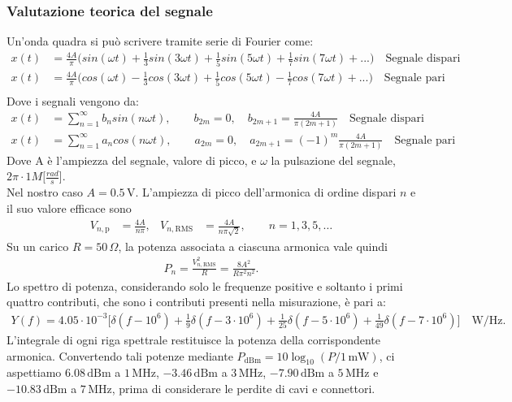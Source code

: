 \documentclass[11pt,a4paper,oneside]{book}
\begin{document}
\subsubsection{Valutazione teorica del segnale}
Un'onda quadra si può scrivere tramite serie di Fourier come:
\begin{align}
x(t)&= \frac{4A}{\pi}\bigg(sin(\omega t)+\frac{1}{3}sin(3\omega t)+\frac{1}{5}sin(5\omega t)+\frac{1}{7}sin(7\omega t)+... \bigg) \quad \text{Segnale dispari} \\
x(t)&= \frac{4A}{\pi}\bigg(cos(\omega t)-\frac{1}{3}cos(3\omega t)+\frac{1}{5}cos(5\omega t)-\frac{1}{7}cos(7\omega t)+... \bigg) \quad \text{Segnale pari} \\
\end{align} 
Dove i segnali vengono da:
\begin{align}
x(t)&=\sum_{n=1}^\infty b_n sin(n\omega t), \qquad b_{2m}=0,\quad b_{2m+1}=\frac{4A}{\pi(2m+1)} \quad \text{Segnale dispari} \\
x(t)&=\sum_{n=1}^\infty a_n cos(n\omega t), \qquad a_{2m}=0,\quad a_{2m+1}=(-1)^m\frac{4A}{\pi(2m+1)} \quad \text{Segnale pari}  
\end{align}
Dove A è l'ampiezza del segnale, valore di picco, e $\omega$ la pulsazione del segnale, $2\pi\cdot 1M[ \frac{rad}{s}$].
\\Nel nostro caso $A=0.5\,\mathrm{V}$. L'ampiezza di picco dell'armonica di ordine dispari $n$ e il suo valore efficace sono
\begin{align}
V_{n,\mathrm{p}}&=\frac{4A}{n\pi}, &
V_{n,\mathrm{RMS}}&=\frac{4A}{n\pi\sqrt{2}}, \qquad n=1,3,5,\ldots
\end{align}
Su un carico $R=50\,\Omega$, la potenza associata a ciascuna armonica vale quindi
\begin{align}
P_n=\frac{V_{n,\mathrm{RMS}}^2}{R}
=\frac{8A^2}{R\pi^2n^2}.
\end{align}
Lo spettro  di potenza, considerando solo le frequenze positive e soltanto i primi quattro contributi, che sono i contributi
presenti nella misurazione, è pari a:
\begin{align}
Y(f)=4.05\cdot10^{-3}\bigg[
\delta(f-10^6)+\frac{1}{9}\delta(f-3\cdot10^6)
+\frac{1}{25}\delta(f-5\cdot10^6)
+\frac{1}{49}\delta(f-7\cdot10^6)\bigg] \quad \mathrm{W/Hz}.
\end{align}
L'integrale di ogni riga spettrale restituisce la potenza della corrispondente armonica. Convertendo tali potenze mediante
$P_{\mathrm{dBm}}=10\log_{10}\!\left(P/1\,\mathrm{mW}\right)$, ci aspettiamo
$6.08\,\mathrm{dBm}$ a $1\,\mathrm{MHz}$, $-3.46\,\mathrm{dBm}$ a $3\,\mathrm{MHz}$,
$-7.90\,\mathrm{dBm}$ a $5\,\mathrm{MHz}$ e $-10.83\,\mathrm{dBm}$ a $7\,\mathrm{MHz}$,
prima di considerare le perdite di cavi e connettori.
\end{document}
